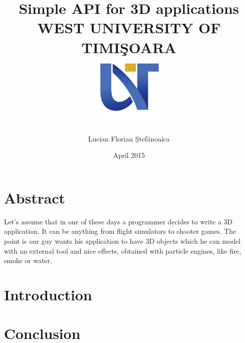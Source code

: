 \documentclass[a4paper, 12pt]{report}
\title{
	{Simple API for 3D applications}\\
	\vspace{2.5cm}
	{\large WEST UNIVERSITY OF TIMI\c SOARA}\\
	{\includegraphics{uvt_logo.jpg}}
}
\author{Lucian Florian \c Stef\u anoaica}
\date{April 2015}
\begin{document}
\maketitle

\chapter*{Abstract}
Let's assume that in one of these days a programmer decides to write a 3D application. It can be anything from flight simulators to shooter games. The point is our guy wants his application to have 3D objects which he can model with an external tool and nice effects, obtained with particle engines, like fire, smoke or water.

\tableofcontents

\chapter{Introduction}

\chapter{Conclusion}


\end{document}

